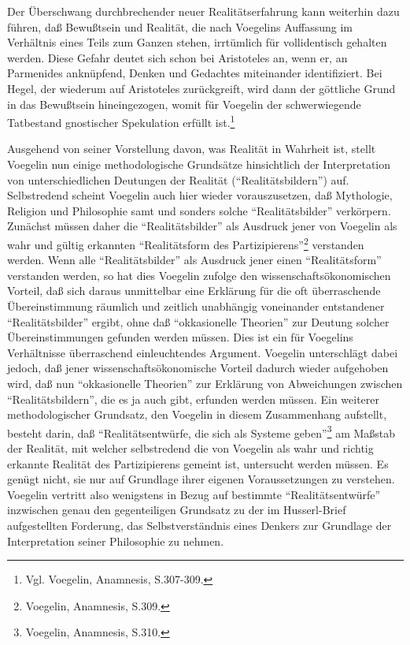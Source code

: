 Der Überschwang durchbrechender neuer Realitätserfahrung kann weiterhin dazu
führen, daß Bewußtsein und Realität, die nach Voegelins Auffassung im
Verhältnis eines Teils zum Ganzen stehen, irrtümlich für vollidentisch gehalten
werden. Diese Gefahr deutet sich schon bei Aristoteles an, wenn er, an
Parmenides anknüpfend, Denken und Gedachtes miteinander identifiziert. Bei
Hegel, der wiederum auf Aristoteles zurückgreift, wird dann der göttliche
Grund in das Bewußtsein hineingezogen, womit für Voegelin der schwerwiegende
Tatbestand gnostischer Spekulation erfüllt ist.\footnote{Vgl. Voegelin,
  Anamnesis, S.307-309.}
 
Ausgehend von seiner Vorstellung davon, was Realität in Wahrheit ist, stellt
Voegelin nun einige methodologische Grundsätze hinsichtlich der Interpretation
von unterschiedlichen Deutungen der Realität ("`Realitätsbildern"') auf.
Selbstredend scheint Voegelin auch hier wieder vorauszusetzen, daß Mythologie,
Religion und Philosophie samt und sonders solche "`Realitätsbilder"'
verkörpern. Zunächst müssen daher die "`Realitätsbilder"' als Ausdruck jener
von Voegelin als wahr und gültig erkannten "`Realitätsform des
Partizipierens"'\footnote{Voegelin, Anamnesis, S.309.} verstanden werden. Wenn
alle "`Realitätsbilder"' als Ausdruck jener einen "`Realitätsform"' verstanden
werden, so hat dies Voegelin zufolge den wissenschaftsökonomischen Vorteil,
daß sich daraus unmittelbar eine Erklärung für die oft überraschende
Übereinstimmung räumlich und zeitlich unabhängig voneinander entstandener
"`Realitätsbilder"' ergibt, ohne daß "`okkasionelle Theorien"' zur Deutung
solcher Übereinstimmungen gefunden werden müssen. Dies ist ein für Voegelins
Verhältnisse überraschend einleuchtendes Argument. Voegelin unterschlägt dabei
jedoch, daß jener wissenschaftsökonomische Vorteil dadurch wieder aufgehoben
wird, daß nun "`okkasionelle Theorien"' zur Erklärung von Abweichungen zwischen
"`Realitätsbildern"', die es ja auch gibt, erfunden werden müssen. Ein
weiterer methodologischer Grundsatz, den Voegelin in diesem Zusammenhang
aufstellt, besteht darin, daß "`Realitätsentwürfe, die sich als Systeme
geben"'\footnote{Voegelin, Anamnesis, S.310.} am Maßstab der Realität, mit
welcher selbstredend die von Voegelin als wahr und richtig erkannte Realität
des Partizipierens gemeint ist, untersucht werden müssen. Es genügt nicht, sie
nur auf Grundlage ihrer eigenen Voraussetzungen zu verstehen. Voegelin
vertritt also wenigstens in Bezug auf bestimmte "`Realitätsentwürfe"'
inzwischen genau den gegenteiligen Grundsatz zu der im Husserl-Brief
aufgestellten Forderung, das Selbstverständnis eines Denkers zur Grundlage der
Interpretation seiner Philosophie zu nehmen.
 
